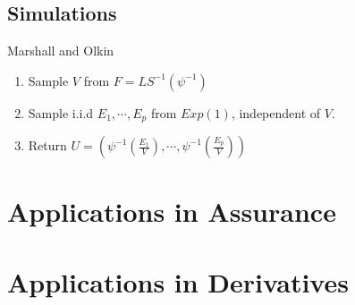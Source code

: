 \documentclass[12pt]{article}
\begin{document}
\subsection{Simulations}
\begin{algorithm}{Marshall and Olkin}{}
\begin{enumerate}
	\item Sample $V$ from $F = LS^{-1}(\psi^{-1})$
	\item Sample i.i.d $E_1,\cdots, E_p$ from $Exp(1)$, independent of $V$.
	\item Return $U = (\psi^{-1}(\frac{E_1}{V}),\cdots,\psi^{-1}(\frac{E_p}{V}))$
\end{enumerate} 
	
\end{algorithm}

%
%

\section{Applications in Assurance}
\section{Applications in Derivatives}
\end{document}
